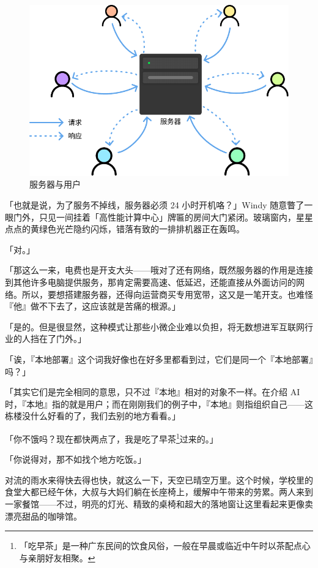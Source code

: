 \begin{figure}[htb!]
  \centering
  \includegraphics[width=.8\textwidth]{assets/surpass/Server_and_users.pdf}
  \caption{服务器与用户}
  \label{fig:Server_and_users}
\end{figure}

「也就是说，为了服务不掉线，服务器必须 24 小时开机咯？」Windy 随意瞥了一眼门外，只见一间挂着「高性能计算中心」牌匾的房间大门紧闭。玻璃窗内，星星点点的黄绿色光芒隐约闪烁，错落有致的一排排机器正在轰鸣。

「对。」

「那这么一来，电费也是开支大头——哦对了还有网络，既然服务器的作用是连接到其他许多电脑提供服务，那肯定需要高速、低延迟，还能直接从外面访问的网络。所以，要想搭建服务器，还得向运营商买专用宽带，这又是一笔开支。也难怪『他』做不下去了，这应该就是苦痛的根源。」

「是的。但是很显然，这种模式让那些小微企业难以负担，将无数想进军互联网行业的人挡在了门外。」

「诶，『本地部署』这个词我好像也在好多\hyperref[cha:bring-intelligence-to-machines]{}里都看到过，它们是同一个『本地部署』吗？」

「其实它们是完全相同的意思，只不过『本地』相对的对象不一样。在介绍 AI 时，『本地』指的就是用户；而在刚刚我们的例子中，『本地』则指组织自己——这栋楼没什么好看的了，我们去别的地方看看。」

「你不饿吗？现在都快两点了，我是吃了早茶\footnote{「吃早茶」是一种广东民间的饮食风俗，一般在早晨或临近中午时以茶配点心与亲朋好友相聚。}过来的。」

「你说得对，那不如找个地方吃饭。」

对流的雨水来得快去得也快，就这么一下，天空已晴空万里。这个时候，学校里的食堂大都已经午休，大叔与大妈们躺在长座椅上，缓解中午带来的劳累。两人来到一家餐馆——不过，明亮的灯光、精致的桌椅和超大的落地窗让这里看起来更像卖漂亮甜品的咖啡馆。

